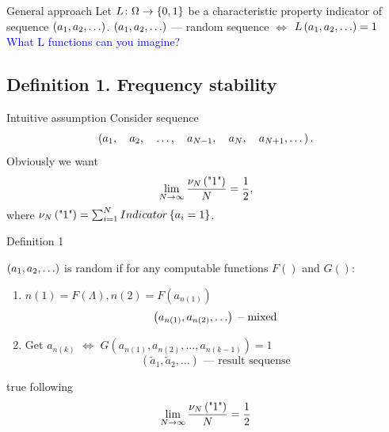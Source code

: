 \documentclass[12pt]{beamer}
\begin{document}
\begin{frame}{General approach}
 Let $L\colon \Omega \rightarrow \left\{0,1\right\}$ be a characteristic property indicator of sequence $\left(a_1, a_2, \ldots\right)$. 
 \newline
 \newline
 $\left(a_1, a_2, \ldots\right)$ --- random sequence $\Leftrightarrow$ $L\left(a_1, a_2, \ldots\right)=1$
 \newline
 \newline
 \newline
 {
 \textcolor{blue}{What L functions can you imagine?}}
\end{frame}

\subsection{Definition 1. Frequency stability}
\begin{frame}{Intuitive assumption}
Consider sequence $$\left(a_1, \quad a_2,\quad  \ldots,\quad  a_{N-1},\quad  a_N,\quad  a_{N+1}, \dots\right).$$
 Obviously we want
\textcolor{blue}{
\begin{equation}
  \lim_{N \rightarrow \infty} \frac{\nu_N\left(\text{"1"}\right)}{N} = \frac12,
 \end{equation}
 }
 where $\nu_N\left(\text{"1"}\right) = \sum_{i = 1}^N Indicator\left\{a_i = 1\right\}$.
\newline
%
\newline
{}
 
\end{frame}

\begin{frame}{Definition 1}
 \begin{block}{}
 $\left(a_1, a_2, \ldots\right)$ is random if for any computable functions $F()$ and $G()$:
  \begin{enumerate}
  \item $n(1) = F(\Lambda), n(2) = F(a_{n(1)})$
  $$\left(a_{n(1)}, a_{n(2)}, \ldots\right) \text{ -- mixed}$$
  \item Get $a_{n(k)}$ $\Leftrightarrow$ $G(a_{n(1)}, a_{n(2)}, \ldots, a_{n(k-1)}) = 1$
  $$(\tilde{a}_1, \tilde{a}_2, \ldots) \text{ --- result sequense}$$
  \end{enumerate}
true following $$\lim_{N \rightarrow \infty} \frac{\nu_N\left(\text{"1"}\right)}{N} = \frac12$$  
 \end{block}

\end{frame}
\end{document}

